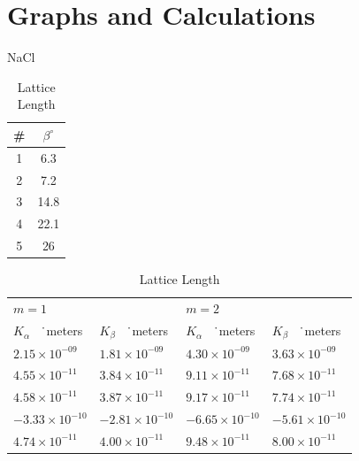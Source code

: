 \documentclass{amsart}
\begin{document}
\renewcommand{\arraystretch}{1.1}
\section{Graphs and Calculations}

\begin{table}[H]
    \begin{minipage}{.25\textwidth}
        \centering
        \caption{NaCl}
        \vspace{13pt}
        \begin{tabular}{c|c}
            \# & $\beta^{\circ}$ \\ \hline
            1    & 6.3             \\
            2    & 7.2             \\
            3    & 14.8            \\
            4    & 22.1            \\
            5    & 26
        \end{tabular}
    \end{minipage}
    \begin{minipage}{.7\textwidth}
            \centering
            \caption{Lattice Length}
            \label{my-label}
            \begin{tabular}{llll}
                $m=1$                               &               &$m=2$                              &               \\
                \multicolumn{1}{l|}{$K_{\alpha}$ \ \.\ meters}  & $K_{\beta }$ \ \.\ meters & \multicolumn{1}{|l|}{$K_{\alpha}$ \ \.\ meters} & $K_{\beta }$  \ \.\ meters\\ \hline
                \multicolumn{1}{l|}{$ 2.15 \times10^{-09}$}      & $ 1.81 \times10^{-09} $     & \multicolumn{1}{|l|}{$ 4.30 \times10^{-09}$}     & $ 3.63 \times10^{-09} $     \\
                \multicolumn{1}{l|}{$ 4.55 \times10^{-11}$}      & $ 3.84 \times10^{-11} $     & \multicolumn{1}{|l|}{$ 9.11 \times10^{-11}$}     & $ 7.68 \times10^{-11} $     \\
                \multicolumn{1}{l|}{$ 4.58 \times10^{-11}$}      & $ 3.87 \times10^{-11} $     & \multicolumn{1}{|l|}{$ 9.17 \times10^{-11}$}     & $ 7.74 \times10^{-11} $     \\
                \multicolumn{1}{l|}{$-3.33 \times10^{-10}$}      & $-2.81 \times10^{-10} $     & \multicolumn{1}{|l|}{$-6.65 \times10^{-10}$}     & $-5.61 \times10^{-10} $     \\
                \multicolumn{1}{l|}{$ 4.74 \times10^{-11}$}      & $ 4.00 \times10^{-11} $     & \multicolumn{1}{|l|}{$ 9.48 \times10^{-11}$}     & $ 8.00 \times10^{-11} $     \\
            \end{tabular}
    \end{minipage}
\end{table}
\end{document}
